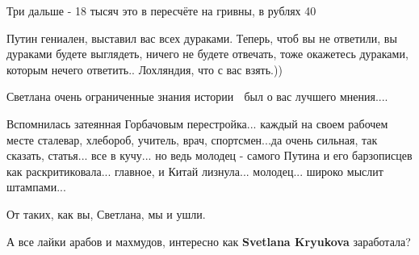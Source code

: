 \begin{itemize}
Три дальше - 18 тысяч это в пересчёте на гривны, в рублях 40

 
Путин гениален, выставил вас всех дураками. Теперь, чтоб вы не ответили, вы дураками будете выглядеть, ничего не будете отвечать, тоже окажетесь дураками, которым нечего ответить.. Лохляндия, что с вас взять.))

 
Светлана очень ограниченные знания истории 🙁 был о вас лучшего мнения....

 

Вспомнилась затеянная Горбачовым перестройка... каждый на своем рабочем месте
сталевар, хлебороб, учитель, врач, спортсмен...да очень сильная, так сказать,
статья... все в кучу... но ведь молодец - самого Путина и его барзописцев как
раскритиковала... главное, и Китай лизнула... молодец... широко мыслит
штампами...


 
От таких, как вы, Светлана, мы и ушли.

 
А все лайки арабов и махмудов, интересно как \textbf{Svetlana Kryukova} заработала?

 

\end{itemize}
